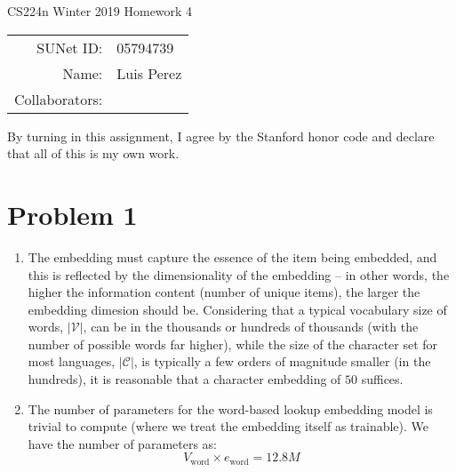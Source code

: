 \documentclass[12pt]{article}
\begin{document}
\begin{center}
{\Large CS224n Winter 2019 Homework 4}

\begin{tabular}{rl}
SUNet ID: & 05794739 \\
Name: & Luis Perez \\
Collaborators: &
\end{tabular}
\end{center}

By turning in this assignment, I agree by the Stanford honor code and declare
that all of this is my own work.

\section*{Problem 1}
\begin{enumerate}[label=(\alph*)]
  \item The embedding must capture the essence of the item being embedded, and this is reflected by the dimensionality of the embedding -- in other words, the higher the information content (number of unique items), the larger the embedding dimesion should be. Considering that a typical vocabulary size of words, $|\mathcal{V}|$, can be in the thousands or hundreds of thousands (with the number of possible words far higher), while the size of the character set for most languages, $|\mathcal{C}|$, is typically a few orders of magnitude smaller (in the hundreds), it is reasonable that a character embedding of $50$ suffices.
  \item The number of parameters for the word-based lookup embedding model is trivial to compute (where we treat the embedding itself as trainable). We have the number of parameters as:
  $$
    V_{\text{word}} \times e_{\text{word}} = 12.8M
  $$


\end{enumerate}
\end{document}
